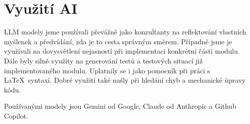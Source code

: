 \section{Využití AI}

LLM modely jsme používali převážně jako konzultanty na reflektování vlastních my\-šlenek a předvídání, zda je to cesta správným směrem.
Případně jsme je využívali na dovysvětlení nejasností při implementaci konkrétní části modulu. Dále byly silně využity na generování testů a testových situací již implementovaného modulu.
Uplatnily se i jako pomocník při práci s \LaTeX\ syntaxí. Dobré využití také našly při hledání chyb a mechanické úpravy kódu.

Používanými modely jsou Gemini od Google, Claude od Anthropic a Github Copilot.
